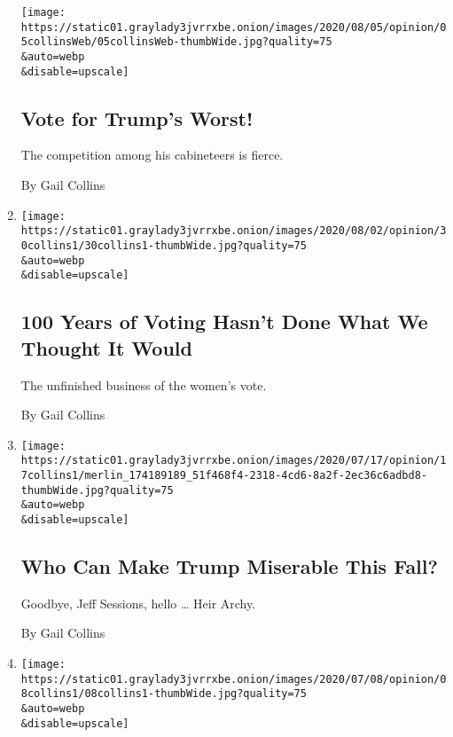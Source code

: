 \begin{enumerate}
  \texttt{[image: https://static01.graylady3jvrrxbe.onion/images/2020/08/05/opinion/05collinsWeb/05collinsWeb-thumbWide.jpg?quality=75\\\&auto=webp\\\&disable=upscale]}

  \hypertarget{vote-for-trumps-worst}{%
  \subsection{Vote for Trump's Worst!}\label{vote-for-trumps-worst}}

  The competition among his cabineteers is fierce.

  By Gail Collins
\item
  \href{/2020/07/30/opinion/sunday/19th-amendment-women-suffrage.html}{}

  \texttt{[image: https://static01.graylady3jvrrxbe.onion/images/2020/08/02/opinion/30collins1/30collins1-thumbWide.jpg?quality=75\\\&auto=webp\\\&disable=upscale]}

  \hypertarget{100-years-of-voting-hasnt-done-what-we-thought-it-would}{%
  \subsection{100 Years of Voting Hasn't Done What We Thought It
  Would}\label{100-years-of-voting-hasnt-done-what-we-thought-it-would}}

  The unfinished business of the women's vote.

  By Gail Collins
\item
  \href{/2020/07/15/opinion/trump-sessions-senate.html}{}

  \texttt{[image: https://static01.graylady3jvrrxbe.onion/images/2020/07/17/opinion/17collins1/merlin\_174189189\_51f468f4-2318-4cd6-8a2f-2ec36c6adbd8-thumbWide.jpg?quality=75\\\&auto=webp\\\&disable=upscale]}

  \hypertarget{who-can-make-trump-miserable-this-fall}{%
  \subsection{Who Can Make Trump Miserable This
  Fall?}\label{who-can-make-trump-miserable-this-fall}}

  Goodbye, Jeff Sessions, hello \ldots{} Heir Archy.

  By Gail Collins
\item
  \href{/2020/07/08/opinion/birth-control-supreme-court.html}{}

  \texttt{[image: https://static01.graylady3jvrrxbe.onion/images/2020/07/08/opinion/08collins1/08collins1-thumbWide.jpg?quality=75\\\&auto=webp\\\&disable=upscale]}


\end{enumerate}
